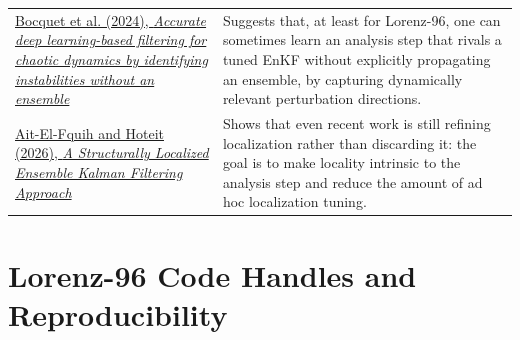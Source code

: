 \documentclass[12pt,a4paper]{article}
\begin{document}
\begin{longtable}{>{\raggedright\arraybackslash}p{4.3cm} >{\raggedright\arraybackslash}p{9.1cm}}
\href{https://arxiv.org/abs/2408.04739}{Bocquet et al. (2024), \emph{Accurate deep learning-based filtering for chaotic dynamics by identifying instabilities without an ensemble}} & Suggests that, at least for Lorenz-96, one can sometimes learn an analysis step that rivals a tuned EnKF without explicitly propagating an ensemble, by capturing dynamically relevant perturbation directions. \\
\href{https://arxiv.org/abs/2603.03926}{Ait-El-Fquih and Hoteit (2026), \emph{A Structurally Localized Ensemble Kalman Filtering Approach}} & Shows that even recent work is still refining localization rather than discarding it: the goal is to make locality intrinsic to the analysis step and reduce the amount of ad hoc localization tuning. \\
\bottomrule
\end{longtable}

\section{Lorenz-96 Code Handles and Reproducibility}\label{app:lorenz-code}
\end{document}
